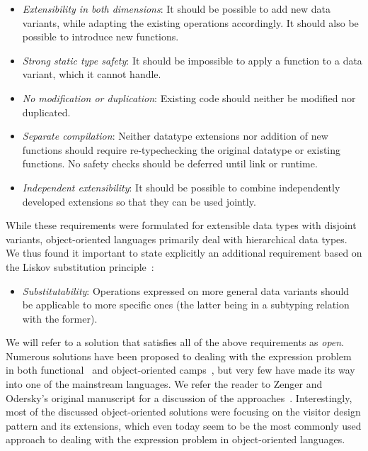 \begin{itemize}
\setlength{\itemsep}{0pt}
\setlength{\parskip}{0pt}
\item \emph{Extensibility in both dimensions}: It should be possible to add new 
      data variants, while adapting the existing operations accordingly. It 
      should also be possible to introduce new functions. 
\item \emph{Strong static type safety}: It should be impossible to apply a 
      function to a data variant, which it cannot handle. 
\item \emph{No modification or duplication}: Existing code should neither be 
      modified nor duplicated.
\item \emph{Separate compilation}: Neither datatype extensions nor addition of 
      new functions should require re-typechecking the original datatype or 
      existing functions. No safety checks should be deferred until link or 
      runtime.
\item \emph{Independent extensibility}: It should be possible to combine 
      independently developed extensions so that they can be used jointly.
\end{itemize}

\noindent
While these requirements were formulated for extensible data types with 
disjoint variants, object-oriented languages primarily deal with 
hierarchical data types. We thus found it important to state explicitly an 
additional requirement based on the Liskov substitution principle~\cite{Lis87}:

\begin{itemize}
\setlength{\itemsep}{0pt}
\setlength{\parskip}{0pt}
\item \emph{Substitutability}: Operations expressed on more general data variants
      should be applicable to more specific ones (the latter being in a 
      subtyping relation with the former).
\end{itemize}


\noindent
We will refer to a solution that satisfies all of the above requirements as \emph{open}. 
Numerous solutions have been proposed to dealing with the expression problem in both 
functional~\cite{garrigue-98,LohHinze2006} and object-oriented 
camps~\cite{Palsberg98,Krishnamurthi98,Zenger:2001,runabout}, but very few have 
made its way into one of the mainstream languages. We refer the reader to Zenger 
and Odersky's original manuscript for a discussion of the approaches~\cite{fool12}.
Interestingly, most of the discussed object-oriented  
solutions were focusing on the visitor design pattern and its extensions, 
which even today seem to be the most commonly used approach to dealing with the 
expression problem in object-oriented languages.

